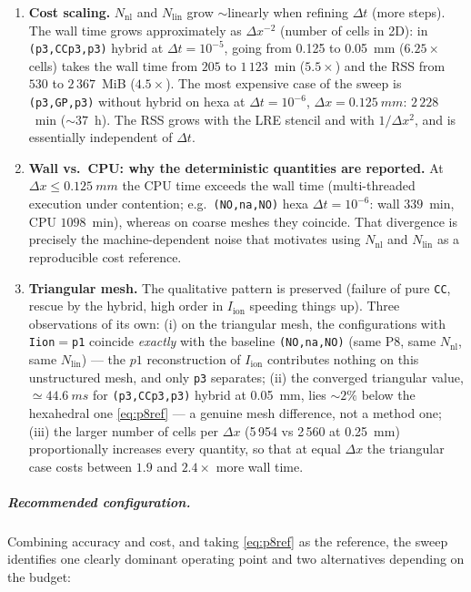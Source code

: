 \documentclass[11pt,a4paper]{article}
\newcommand{\code}[1]{\texttt{\small #1}}
\newcommand{\Iion}{I_{\mathrm{ion}}}
\begin{document}
\begin{enumerate}[topsep=3pt,itemsep=3pt,leftmargin=1.5em]
        \code{CC}.
  \item \textbf{Cost scaling.} $N_{\mathrm{nl}}$ and $N_{\mathrm{lin}}$ grow
        $\sim$linearly when refining $\Delta t$ (more steps). The wall time grows
        approximately as $\Delta x^{-2}$ (number of cells in 2D): in
        \code{(p3,CCp3,p3)} hybrid at $\Delta t=10^{-5}$, going from \SI{0.125}{} to
        \SI{0.05}{mm} ($6.25\times$ cells) takes the wall time from $205$ to $1\,123$~min
        ($5.5\times$) and the RSS from $530$ to $2\,367$~MiB ($4.5\times$). The most expensive
        case of the sweep is \code{(p3,GP,p3)} without hybrid on hexa at $\Delta t=10^{-6}$,
        $\Delta x=\SI{0.125}{mm}$: $2\,228$~min ($\sim 37$~h). The RSS grows with the
        LRE stencil and with $1/\Delta x^2$, and is essentially independent of
        $\Delta t$.
  \item \textbf{Wall vs.\ CPU: why the deterministic quantities are reported.} At
        $\Delta x\le\SI{0.125}{mm}$ the CPU time exceeds the wall time (multi-threaded
        execution under contention; e.g.\ \code{(NO,na,NO)} hexa $\Delta t=10^{-6}$:
        wall $339$~min, CPU $1098$~min), whereas on coarse meshes they coincide. That
        divergence is precisely the machine-dependent noise that motivates using
        $N_{\mathrm{nl}}$ and $N_{\mathrm{lin}}$ as a reproducible cost reference.
  \item \textbf{Triangular mesh.} The qualitative pattern is preserved (failure of
        pure \code{CC}, rescue by the hybrid, high order in $\Iion$ speeding things up).
        Three observations of its own: (i) on the triangular mesh, the configurations with
        \code{Iion}$=$\code{p1} coincide \emph{exactly} with the baseline
        \code{(NO,na,NO)} (same P8, same $N_{\mathrm{nl}}$, same
        $N_{\mathrm{lin}}$) --- the $p1$ reconstruction of $\Iion$ contributes nothing on this
        unstructured mesh, and only \code{p3} separates; (ii) the converged
        triangular value, $\simeq\SI{44.6}{ms}$ for \code{(p3,CCp3,p3)} hybrid at
        \SI{0.05}{mm}, lies $\sim 2\%$ below the hexahedral one
        \eqref{eq:p8ref} --- a genuine mesh difference, not a method one; (iii) the
        larger number of cells per $\Delta x$ (5\,954 vs 2\,560 at \SI{0.25}{mm})
        proportionally increases every quantity, so that at equal
        $\Delta x$ the triangular case costs between $1.9$ and $2.4\times$ more wall time.
\end{enumerate}

\subparagraph{Recommended configuration.}
\label{sec:res2d:reco}
Combining accuracy and cost, and taking \eqref{eq:p8ref} as the reference, the sweep
identifies one clearly dominant operating point and two alternatives depending on the
budget:
\end{document}
